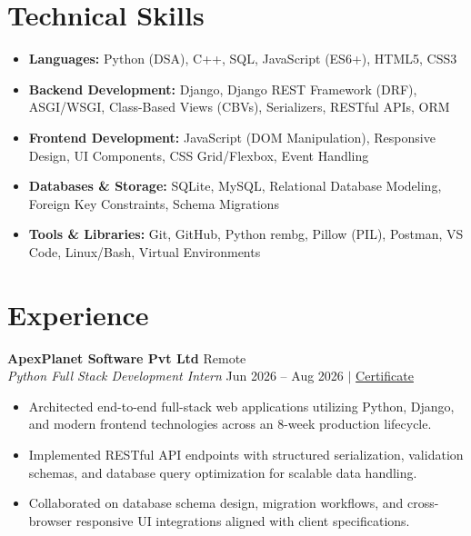 \documentclass[a4paper,9pt]{extarticle}
\begin{document}
\section{Technical Skills}
\begin{itemize}
    \item \textbf{Languages:} Python (DSA), C++, SQL, JavaScript (ES6+), HTML5, CSS3
    \item \textbf{Backend Development:} Django, Django REST Framework (DRF), ASGI/WSGI, Class-Based Views (CBVs), Serializers, RESTful APIs, ORM
    \item \textbf{Frontend Development:} JavaScript (DOM Manipulation), Responsive Design, UI Components, CSS Grid/Flexbox, Event Handling
    \item \textbf{Databases \& Storage:} SQLite, MySQL, Relational Database Modeling, Foreign Key Constraints, Schema Migrations
    \item \textbf{Tools \& Libraries:} Git, GitHub, Python rembg, Pillow (PIL), Postman, VS Code, Linux/Bash, Virtual Environments
\end{itemize}

\vspace{-3pt}

\section{Experience}

\textbf{ApexPlanet Software Pvt Ltd} \hfill Remote \\
\textit{Python Full Stack Development Intern} \hfill Jun 2026 -- Aug 2026 $|$ \href{https://drive.google.com/file/d/1V9wtq7YhPrYaY8XAgqW-SQYIzYHHFOTs/view?usp=sharing}{Certificate}
\begin{itemize}
    \item Architected end-to-end full-stack web applications utilizing Python, Django, and modern frontend technologies across an 8-week production lifecycle.
    \item Implemented RESTful API endpoints with structured serialization, validation schemas, and database query optimization for scalable data handling.
    \item Collaborated on database schema design, migration workflows, and cross-browser responsive UI integrations aligned with client specifications.
\end{itemize}

\vspace{-3pt}
\end{document}
